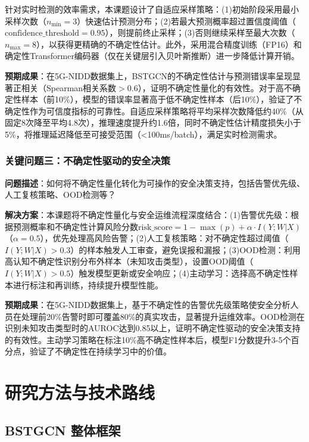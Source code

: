 针对实时检测的效率需求，本课题设计了自适应采样策略：(1)初始阶段采用最小采样次数（$n_{\min}=3$）快速估计预测分布；(2)若最大预测概率超过置信度阈值（$\text{confidence\_threshold}=0.95$），则提前终止采样；(3)否则继续采样至最大次数（$n_{\max}=8$），以获得更精确的不确定性估计。此外，采用混合精度训练（FP16）和确定性Transformer编码器（仅在关键层引入贝叶斯推断）进一步降低计算开销。

\textbf{预期成果}：在5G-NIDD数据集上，BSTGCN的不确定性估计与预测错误率呈现显著正相关（Spearman相关系数$>0.6$），证明不确定性量化的有效性。对于高不确定性样本（前10\%），模型的错误率显著高于低不确定性样本（后10\%），验证了不确定性作为可信度指标的可靠性。自适应采样策略将平均采样次数降低约40\%（从固定8次降至平均4.8次），推理速度提升约1.6倍，同时不确定性估计精度损失小于5\%，将推理延迟降低至可接受范围（<100ms/batch），满足实时检测需求。

\subsubsection{关键问题三：不确定性驱动的安全决策}


\textbf{问题描述}：如何将不确定性量化转化为可操作的安全决策支持，包括告警优先级、人工复核策略、OOD检测等？

\textbf{解决方案}：本课题将不确定性量化与安全运维流程深度结合：(1)告警优先级：根据预测概率和不确定性计算风险分数$\text{risk\_score} = 1 - \max(p) + \alpha \cdot I(Y;W|X)$（$\alpha=0.5$），优先处理高风险告警；(2)人工复核策略：对不确定性超过阈值（$I(Y;W|X) > 0.3$）的样本触发人工审查，避免误报和漏报；(3)OOD检测：利用高认知不确定性识别分布外样本（未知攻击类型），设置OOD阈值（$I(Y;W|X) > 0.5$）触发模型更新或安全响应；(4)主动学习：选择高不确定性样本进行标注和再训练，持续提升模型性能。

\textbf{预期成果}：在5G-NIDD数据集上，基于不确定性的告警优先级策略使安全分析人员在处理前20\%告警时即可覆盖80\%的真实攻击，显著提升运维效率。OOD检测在识别未知攻击类型时的AUROC达到0.85以上，证明不确定性驱动的安全决策支持的有效性。主动学习策略在标注10\%高不确定性样本后，模型F1分数提升3-5个百分点，验证了不确定性在持续学习中的价值。



\section{研究方法与技术路线}

\subsection{BSTGCN 整体框架}

